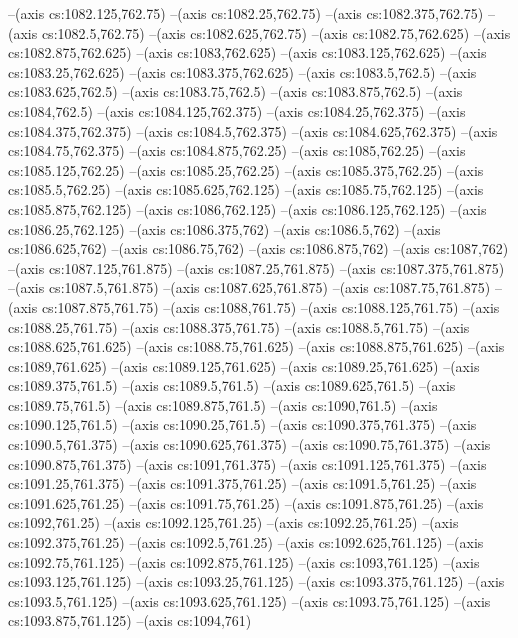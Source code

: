 --(axis cs:1082.125,762.75)
--(axis cs:1082.25,762.75)
--(axis cs:1082.375,762.75)
--(axis cs:1082.5,762.75)
--(axis cs:1082.625,762.75)
--(axis cs:1082.75,762.625)
--(axis cs:1082.875,762.625)
--(axis cs:1083,762.625)
--(axis cs:1083.125,762.625)
--(axis cs:1083.25,762.625)
--(axis cs:1083.375,762.625)
--(axis cs:1083.5,762.5)
--(axis cs:1083.625,762.5)
--(axis cs:1083.75,762.5)
--(axis cs:1083.875,762.5)
--(axis cs:1084,762.5)
--(axis cs:1084.125,762.375)
--(axis cs:1084.25,762.375)
--(axis cs:1084.375,762.375)
--(axis cs:1084.5,762.375)
--(axis cs:1084.625,762.375)
--(axis cs:1084.75,762.375)
--(axis cs:1084.875,762.25)
--(axis cs:1085,762.25)
--(axis cs:1085.125,762.25)
--(axis cs:1085.25,762.25)
--(axis cs:1085.375,762.25)
--(axis cs:1085.5,762.25)
--(axis cs:1085.625,762.125)
--(axis cs:1085.75,762.125)
--(axis cs:1085.875,762.125)
--(axis cs:1086,762.125)
--(axis cs:1086.125,762.125)
--(axis cs:1086.25,762.125)
--(axis cs:1086.375,762)
--(axis cs:1086.5,762)
--(axis cs:1086.625,762)
--(axis cs:1086.75,762)
--(axis cs:1086.875,762)
--(axis cs:1087,762)
--(axis cs:1087.125,761.875)
--(axis cs:1087.25,761.875)
--(axis cs:1087.375,761.875)
--(axis cs:1087.5,761.875)
--(axis cs:1087.625,761.875)
--(axis cs:1087.75,761.875)
--(axis cs:1087.875,761.75)
--(axis cs:1088,761.75)
--(axis cs:1088.125,761.75)
--(axis cs:1088.25,761.75)
--(axis cs:1088.375,761.75)
--(axis cs:1088.5,761.75)
--(axis cs:1088.625,761.625)
--(axis cs:1088.75,761.625)
--(axis cs:1088.875,761.625)
--(axis cs:1089,761.625)
--(axis cs:1089.125,761.625)
--(axis cs:1089.25,761.625)
--(axis cs:1089.375,761.5)
--(axis cs:1089.5,761.5)
--(axis cs:1089.625,761.5)
--(axis cs:1089.75,761.5)
--(axis cs:1089.875,761.5)
--(axis cs:1090,761.5)
--(axis cs:1090.125,761.5)
--(axis cs:1090.25,761.5)
--(axis cs:1090.375,761.375)
--(axis cs:1090.5,761.375)
--(axis cs:1090.625,761.375)
--(axis cs:1090.75,761.375)
--(axis cs:1090.875,761.375)
--(axis cs:1091,761.375)
--(axis cs:1091.125,761.375)
--(axis cs:1091.25,761.375)
--(axis cs:1091.375,761.25)
--(axis cs:1091.5,761.25)
--(axis cs:1091.625,761.25)
--(axis cs:1091.75,761.25)
--(axis cs:1091.875,761.25)
--(axis cs:1092,761.25)
--(axis cs:1092.125,761.25)
--(axis cs:1092.25,761.25)
--(axis cs:1092.375,761.25)
--(axis cs:1092.5,761.25)
--(axis cs:1092.625,761.125)
--(axis cs:1092.75,761.125)
--(axis cs:1092.875,761.125)
--(axis cs:1093,761.125)
--(axis cs:1093.125,761.125)
--(axis cs:1093.25,761.125)
--(axis cs:1093.375,761.125)
--(axis cs:1093.5,761.125)
--(axis cs:1093.625,761.125)
--(axis cs:1093.75,761.125)
--(axis cs:1093.875,761.125)
--(axis cs:1094,761)
